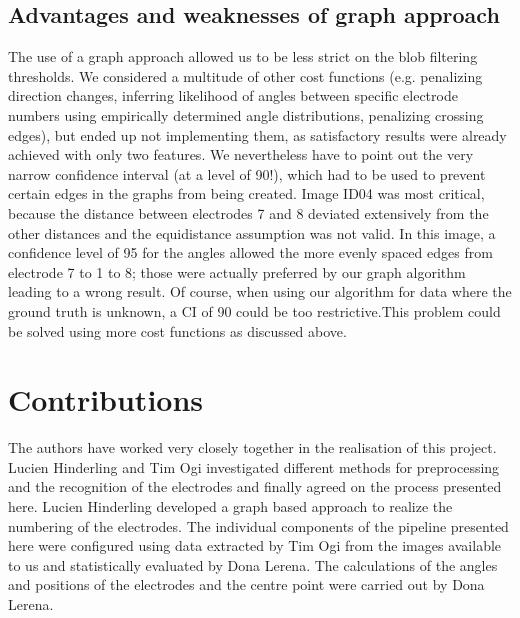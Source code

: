 \documentclass[a4paper, 10pt, twocolumn]{article}
\begin{document}
\subsection{Advantages and weaknesses of graph approach}
The use of a graph approach allowed us to be less strict on the blob filtering thresholds. We considered a multitude of other cost functions (e.g. penalizing direction changes, inferring likelihood of angles between specific electrode numbers using empirically determined angle distributions, penalizing crossing edges), but ended up not implementing them, as satisfactory results were already achieved with only two features.
We nevertheless have to point out the very narrow confidence interval (at a level of 90!), which had to be used to prevent certain edges in the graphs from being created. Image ID04 was most critical, because the distance between electrodes 7 and 8 deviated extensively from the other distances and the equidistance assumption was not valid. In this image, a confidence level of 95 for the angles allowed the more evenly spaced edges from electrode 7 to 1 to 8; those were actually preferred by our graph algorithm leading to a wrong result. Of course, when using our algorithm for data where the ground truth is unknown, a CI of 90 could be too restrictive.This problem could be solved using more cost functions as discussed above. 




\section{Contributions}
The authors have worked very closely together in the realisation of this project. Lucien Hinderling and Tim Ogi investigated different methods for preprocessing and the recognition of the electrodes and finally agreed on the process presented here. Lucien Hinderling developed a graph based approach to realize the numbering of the electrodes. The individual components of the pipeline presented here were configured using data extracted by Tim Ogi from the images available to us and statistically evaluated by Dona Lerena. The calculations of the angles and positions of the electrodes and the centre point were carried out by Dona Lerena.
\end{document}
